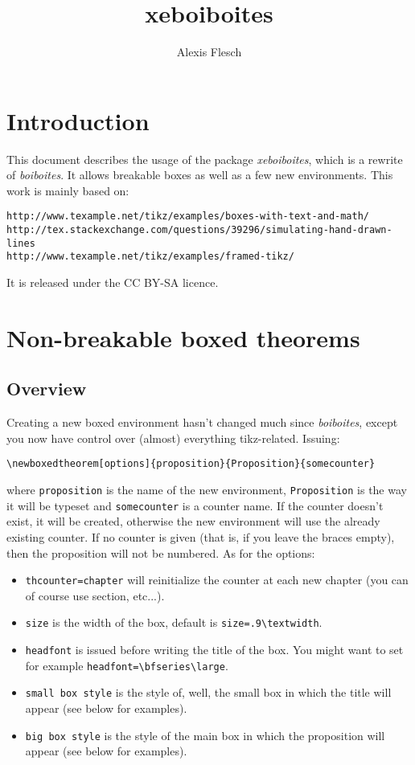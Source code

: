 \documentclass[11pt,oneside]{article}
\title{\Huge\bfseries xeboiboites}
\author{Alexis Flesch}
\begin{document}
\maketitle

\tableofcontents\clearpage

\section{Introduction}

This document describes the usage of the package \emph{xeboiboites}, which is a 
rewrite of \emph{boiboites}. It allows breakable boxes as well as a few new 
environments. This work is mainly based on:
\begin{verbatim}
http://www.texample.net/tikz/examples/boxes-with-text-and-math/
http://tex.stackexchange.com/questions/39296/simulating-hand-drawn-lines
http://www.texample.net/tikz/examples/framed-tikz/
\end{verbatim}
It is released under the CC BY-SA licence.

\section{Non-breakable boxed theorems}

\subsection{Overview}

Creating a new boxed environment hasn't changed much since \emph{boiboites}, 
except you now have control over (almost) everything tikz-related. Issuing:

\begin{verbatim}
\newboxedtheorem[options]{proposition}{Proposition}{somecounter}
\end{verbatim}

where \verb!proposition! is the name of the new environment, \verb!Proposition! 
is the way it will be typeset and \verb!somecounter! is a counter name. If the 
counter doesn't exist, it will be created, otherwise the new environment will 
use the already existing counter. If no counter is given (that is, if you leave 
the braces empty), then the proposition will not be numbered. As for the 
options:
\begin{itemize}
    \item \verb!thcounter=chapter! will reinitialize the counter at each new 
        chapter (you can of course use section, etc...).
    \item \verb!size! is the width of the box, default is 
        \verb!size=.9\textwidth!.
    \item \verb!headfont! is issued before writing the title of the box. You 
        might want to set for example \verb!headfont=\bfseries\large!.
    \item \verb!small box style! is the style of, well, the small box in which 
        the title will appear (see below for examples).
    \item \verb!big box style! is the style of the main box in which the 
        proposition will appear (see below for examples).
\end{itemize}
\end{document}
